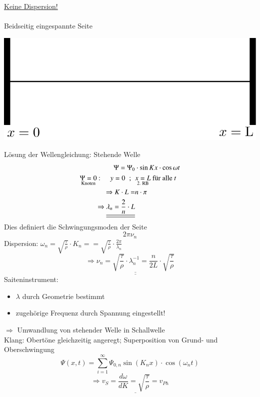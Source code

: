  \underline{Keine Dispersion!}\\
 \hfill \\
 Beidseitig eingespannte Seite
\begin{center}
	\includegraphics[width=0.5\linewidth]{skizzen/19/19B22}
\end{center}
 Lösung der Wellengleichung: Stehende Welle\\
 \begin{align*}
 	\Psi = \Psi_0 & \cdot \sin Kx \cdot \cos \omega t\\
 	\underset{\text{Knoten}}{\Psi = 0} \text{ :} \hspace{5mm} y=0\hspace{2mm};\hspace{2mm}&\underset{\text{2. RB}}{x=L} \text{ für alle } t\\
 	\Rightarrow K \cdot L = &n \cdot \pi\\
 	\Rightarrow \underline{\underline{\lambda_n = \frac{2}{n} \cdot L}}
 \end{align*}
 Dies definiert die Schwingungsmoden der Seite\\
 $$ 2\pi\nu_n $$
 Dispersion: $ \omega_n = \sqrt{\frac{\tau}{\rho}} \cdot K_n = = \sqrt{\frac{\tau}{\rho}} \cdot \frac{2\pi}{\lambda_n} $
 $$ \Rightarrow \underline{\underline{\nu_n = \sqrt{\frac{\tau}{\rho}} \cdot \lambda_n^{-1} = \frac{n}{2L} \cdot \sqrt{\frac{\tau}{\rho} } } } $$
 Saiteninstrument:
 \begin{itemize}
 	\item $ \lambda $ durch Geometrie bestimmt
 	\item zugehörige Frequenz durch Spannung eingestellt!
 \end{itemize}
 $ \Rightarrow $ Umwandlung von stehender Welle in Schallwelle\\
 Klang: Obertöne gleichzeitig angeregt; Superposition von Grund- und Oberschwingung
 $$ \Psi(x,t) = \sum_{i=1}^{\infty} \Psi_{0,n} \sin(K_nx) \cdot \cos(\omega_nt) $$
 $$ \Rightarrow \underline{v_S = \frac{d\omega}{dK} = \sqrt{\frac{\tau}{\rho}} = v_{Ph}} $$